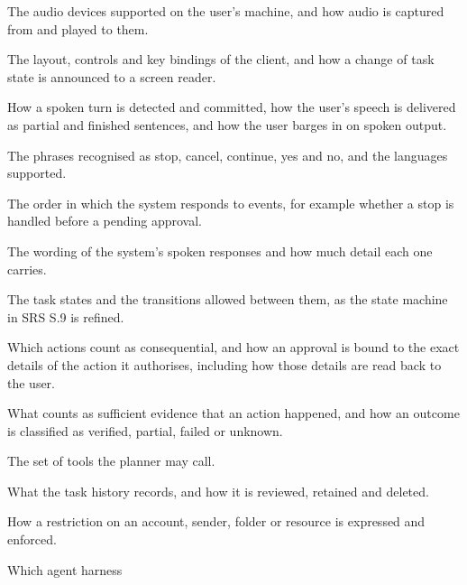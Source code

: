 \documentclass[12pt, titlepage]{article}
\newcounter{acnum}
\newcommand{\actheacnum}{AC\theacnum}
\begin{document}
\begin{description}[leftmargin=1.2cm]
\item[\refstepcounter{acnum} \actheacnum \label{acAudio}:] The audio devices
supported on the user's machine, and how audio is captured from and played to
them.
\item[\refstepcounter{acnum} \actheacnum \label{acClient}:] The layout, controls
and key bindings of the client, and how a change of task state is announced to a
screen reader.
\item[\refstepcounter{acnum} \actheacnum \label{acVoice}:] How a spoken turn is
detected and committed, how the user's speech is delivered as partial and
finished sentences, and how the user barges in on spoken output.
\item[\refstepcounter{acnum} \actheacnum \label{acPhrase}:] The phrases
recognised as stop, cancel, continue, yes and no, and the languages supported.
\item[\refstepcounter{acnum} \actheacnum \label{acCtrl}:] The order in which the
system responds to events, for example whether a stop is handled before a
pending approval.
\item[\refstepcounter{acnum} \actheacnum \label{acResponse}:] The wording of the
system's spoken responses and how much detail each one carries.
\item[\refstepcounter{acnum} \actheacnum \label{acTask}:] The task states and the
transitions allowed between them, as the state machine in SRS S.9 is refined.
\item[\refstepcounter{acnum} \actheacnum \label{acGate}:] Which actions count as
consequential, and how an approval is bound to the exact details of the action it
authorises, including how those details are read back to the user.
\item[\refstepcounter{acnum} \actheacnum \label{acVerify}:] What counts as
sufficient evidence that an action happened, and how an outcome is classified as
verified, partial, failed or unknown.
\item[\refstepcounter{acnum} \actheacnum \label{acTools}:] The set of tools the
planner may call.
\item[\refstepcounter{acnum} \actheacnum \label{acHist}:] What the task history
records, and how it is reviewed, retained and deleted.
\item[\refstepcounter{acnum} \actheacnum \label{acPolicy}:] How a restriction on
an account, sender, folder or resource is expressed and enforced.
\item[\refstepcounter{acnum} \actheacnum \label{acHarness}:] Which agent harness

\end{description}
\end{document}
